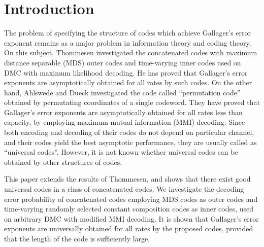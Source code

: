 \newtheorem{theo}{Theorem}
\newtheorem{lemma}{Lemma}
\newtheorem{col}{Corollary}
\newtheorem{defini}{Definition}
\newtheorem{pro}{Property}
\def\bm#1{\mbox{\boldmath{$#1$}}}
\def\eqtri{\stackrel{\triangle}{=}}
\def\c#1{#1^{\dagger}}
\newcommand{\gf}{\mbox{$GF(q)$}}
\newcommand{\av}[1]{\mbox{E${\displaystyle\left[ #1 \right]}$}}
\def\r{\bm{r}}
\def\s{\bm{s}}
\def\w{\bm{w}}
\def\x{\bm{x}}
\def\y{\bm{y}}
\def\a{\bm{a}}
\def\u{\bm{u}}
\def\cX{{\cal X}}
\def\cY{{\cal Y}}
\def\cP{{\cal P}}
\def\cV{{\cal V}}
\newcommand{\g}{\mbox{$\Gamma$}}
\def\qed{\strut\hfill(Q.E.D.)}
\def\eot{\strut\hfill$\Box$}
\def\osum{\bigcirc\hspace{-1.2em}\sum}
\newcommand{\vt}[1]{\mbox{\boldmath $#1$}}

\chapter{Introduction}
The problem of specifying the structure of codes which achieve
Gallager's error exponent remains as a major problem
in information theory and coding theory.
On this subject, Thommesen\cite{th} investigated the concatenated codes with
maximum distance separable (MDS) 
outer codes and time-varying inner codes used on DMC with
maximum likelihood decoding. He has proved that Gallager's error
exponents are asymptotically obtained for all rates by such codes.
On the other hand, Ahlswede and Dueck\cite{ah} investigated the code 
called ``permutation code'' obtained by 
permutating coordinates of a single codeword.
They have proved that Gallager's error exponents 
are asymptotically obtained for all rates less than capacity,
by employing maximum mutual information (MMI) decoding. 
Since both encoding and decoding of 
their codes do not depend on particular channel,
and their codes yield the best asymptotic performance,
they are usually called as ``universal codes''.
However, it is not known whether universal codes can be
obtained by other structures of codes.

This paper extends the results of Thommesen, and shows 
that there exist good universal codes in a class of concatenated codes.
We investigate the decoding error probability of concatenated codes 
employing MDS codes as outer codes and time-varying randomly selected 
constant composition codes as inner codes, 
used on arbitrary DMC with modified MMI decoding.
It is shown that Gallager's 
error exponents are universally obtained for all rates
by the proposed codes, provided that the length of the code
is sufficiently large.

